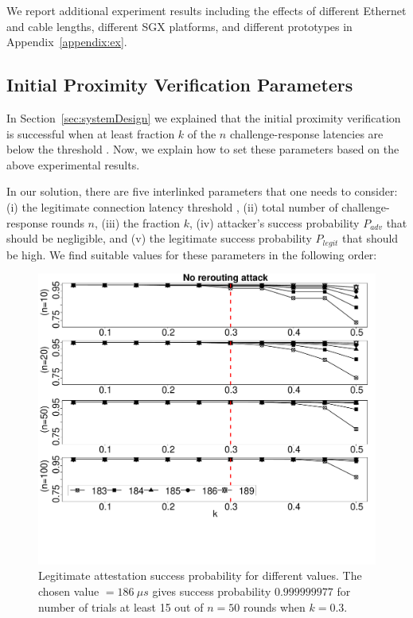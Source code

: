 We report additional experiment results including the effects of different Ethernet and \usb cable lengths, different SGX platforms, and different \device{} prototypes in Appendix~\ref{appendix:ex}.

\subsection{Initial Proximity Verification Parameters}
\label{sec:evaluation:parameters}

In Section~\ref{sec:systemDesign} we explained that the initial proximity verification is successful when at least fraction $k$ of the $n$ challenge-response latencies are below the threshold \connect.  Now, we explain how to set these parameters based on the above experimental results.

In our solution, there are five interlinked parameters that one needs to consider: (i) the legitimate connection latency threshold \connect, (ii) total number of challenge-response rounds $n$, (iii) the fraction $k$, (iv) attacker's success probability $P_{adv}$ that should be negligible, and (v) the legitimate success probability $P_{legit}$ that should be high. We find suitable values for these parameters in the following order:


\begin{figure}[t]
  \centering
    \includegraphics[trim={0 5cm 0 0}, clip, width=\linewidth]{data/fx3_data/timeRound.pdf}
    \caption{Legitimate attestation success probability for different \connect values. The chosen value \connect $=186\ \mu s$ gives success probability $0.999999977$ for number of trials at least 15 out of $n=50$ rounds when $k=0.3$.}
	\figsaver
    \label{graph:diffTh}
\end{figure}


